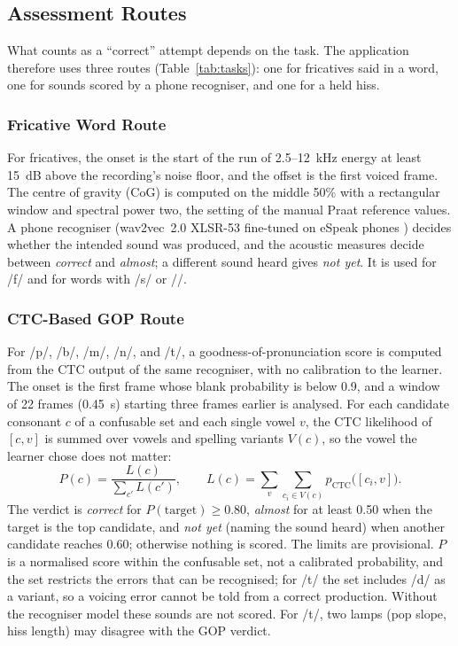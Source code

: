 \documentclass[engproc,article,submit,moreauthors]{Definitions/mdpi}
\newcommand{\ipa}[1]{/#1/}
\begin{document}
\subsection{Assessment Routes}
What counts as a ``correct'' attempt depends on the task. The application therefore uses three routes (Table~\ref{tab:tasks}): one for fricatives said in a word, one for sounds scored by a phone recogniser, and one for a held hiss.

\subsubsection{Fricative Word Route}
For fricatives, the onset is the start of the run of 2.5--12~kHz energy at least 15~dB above the recording's noise floor, and the offset is the first voiced frame. The centre of gravity (CoG) is computed on the middle 50\% with a rectangular window and spectral power two, the setting of the manual Praat reference values. A phone recogniser (wav2vec~2.0 XLSR-53 fine-tuned on eSpeak phones \cite{baevski2020,xu2022}) decides whether the intended sound was produced, and the acoustic measures decide between \textit{correct} and \textit{almost}; a different sound heard gives \textit{not yet}. It is used for \ipa{f} and for words with \ipa{s} or \ipa{\textesh}.

\subsubsection{CTC-Based GOP Route}
For \ipa{p}, \ipa{b}, \ipa{m}, \ipa{n}, and \ipa{t\textesh}, a goodness-of-pronunciation score is computed from the CTC output of the same recogniser, with no calibration to the learner. The onset is the first frame whose blank probability is below 0.9, and a window of 22 frames (0.45~s) starting three frames earlier is analysed. For each candidate consonant $c$ of a confusable set and each single vowel $v$, the CTC likelihood of $[c,v]$ is summed over vowels and spelling variants $V(c)$, so the vowel the learner chose does not matter:
\begin{equation}
P(c)=\frac{L(c)}{\sum_{c'} L(c')},\qquad L(c)=\sum_{v}\sum_{c_i\in V(c)} p_{\mathrm{CTC}}\bigl([c_i,v]\bigr).
\end{equation}
The verdict is \textit{correct} for $P(\text{target})\geq0.80$, \textit{almost} for at least 0.50 when the target is the top candidate, and \textit{not yet} (naming the sound heard) when another candidate reaches 0.60; otherwise nothing is scored. The limits are provisional. $P$ is a normalised score within the confusable set, not a calibrated probability, and the set restricts the errors that can be recognised; for \ipa{t\textesh} the set includes \ipa{d\textyogh} as a variant, so a voicing error cannot be told from a correct production. Without the recogniser model these sounds are not scored. For \ipa{t\textesh}, two lamps (pop slope, hiss length) may disagree with the GOP verdict.
\end{document}
